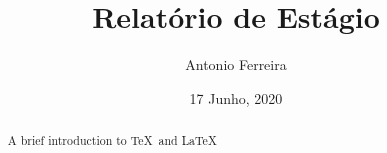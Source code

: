 \documentclass[]{report}   %
\begin{document}
\title{Relatório de Estágio}   %
\author{Antonio Ferreira}         %
\date{17 Junho, 2020}    %
\maketitle

\begin{abstract}
  A brief introduction to \TeX\ and \LaTeX
\end{abstract}





\begin{thebibliography}{9}
\end{thebibliography}
\end{document}
